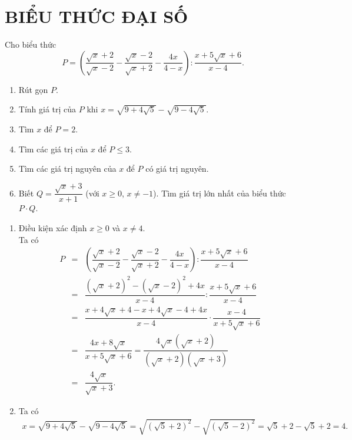 \chapter{BIỂU THỨC ĐẠI SỐ}
\setcounter{section}{1}

\begin{bt}%
	Cho biểu thức
	$$P=\left(\dfrac{\sqrt{x}+2}{\sqrt{x}-2}-\dfrac{\sqrt{x}-2}{\sqrt{x}+2} - \dfrac{4x}{4-x}\right): \dfrac{x+5\sqrt{x}+6}{x-4}.$$
	\begin{enumerate}
		\item Rút gọn $P$.
		\item Tính giá trị của $P$ khi $x=\sqrt{9+4\sqrt{5}} - \sqrt{9-4\sqrt{5}}$.
		\item Tìm $x$ để $P=2$.
		\item Tìm các giá trị của $x$ để $P \leq 3$.
		\item Tìm các giá trị nguyên của $x$ để $P$ có giá trị nguyên.
		\item Biết $Q=\dfrac{\sqrt{x}+3}{x+1}$ (với $x\geq 0$, $x \neq -1$). Tìm giá trị lớn nhất của biểu thức $P \cdot Q$.
	\end{enumerate}
	\loigiai
	{
		\begin{enumerate}
			\item Điều kiện xác định $x \geq 0$ và $x \neq 4$.\\
			Ta có
			\allowdisplaybreaks
			\begin{eqnarray*}
				P &=& \left(\dfrac{\sqrt{x}+2}{\sqrt{x}-2}-\dfrac{\sqrt{x}-2}{\sqrt{x}+2} - \dfrac{4x}{4-x}\right): \dfrac{x+5\sqrt{x}+6}{x-4} \\
				&=& \dfrac{\left(\sqrt{x}+2\right)^2-\left(\sqrt{x}-2\right)^2 + 4x}{x-4} : \dfrac{x+5\sqrt{x}+6}{x-4}\\
				&=& \dfrac{x+4\sqrt{x}+4 - x+4\sqrt{x}-4 + 4x}{x-4} \cdot \dfrac{x-4}{x+5\sqrt{x}+6}\\
				&=& \dfrac{4x+8\sqrt{x}}{x+5\sqrt{x}+6} = \dfrac{4\sqrt{x}\left(\sqrt{x}+2\right)}{\left(\sqrt{x}+2\right)\left(\sqrt{x}+3\right)}\\
				&=& \dfrac{4\sqrt{x}}{\sqrt{x}+3}.
			\end{eqnarray*}
			\item Ta có
			\begin{eqnarray*}
				x=\sqrt{9+4\sqrt{5}} - \sqrt{9-4\sqrt{5}} = \sqrt{\left(\sqrt{5}+2\right)^2} - \sqrt{\left(\sqrt{5}-2\right)^2} = \sqrt{5}+2 - \sqrt{5}+2 = 4.
			\end{eqnarray*}

\end{enumerate}}
\end{bt}
